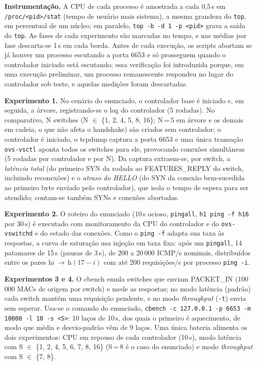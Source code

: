 \documentclass[12pt]{article}
\begin{document}
\textbf{Instrumentação.} A CPU de cada processo é amostrada a cada 0,5\,s em
\texttt{/proc/<pid>/stat} (tempo de usuário mais sistema), a mesma grandeza do
\texttt{top}, em percentual de um núcleo; em paralelo, \texttt{top -b -d 1 -p <pid>}
grava a saída do \texttt{top}. As fases de cada experimento são marcadas no tempo, e nas
médias por fase descarta-se 1\,s em cada borda. Antes de cada execução, os scripts
abortam se já houver um processo escutando a porta 6653 e só prosseguem quando o
controlador iniciado está escutando; essa verificação foi introduzida porque, em uma
execução preliminar, um processo remanescente respondeu no lugar do controlador sob
teste, e aquelas medições foram descartadas.

\textbf{Experimento 1.} No cenário do enunciado, o controlador base é iniciado e, em
seguida, a árvore, registrando-se o log do controlador (5 rodadas). No comparativo, N
switches (N $\in$ \{1, 2, 4, 5, 8, 16\}; N\,=\,5 em árvore e os demais em cadeia, o que
não afeta o handshake) são criados sem controlador; o controlador é iniciado, o tcpdump
captura a porta 6653 e uma única transação \texttt{ovs-vsctl} aponta todos os switches
para ele, provocando conexões simultâneas (5 rodadas por controlador e por N). Da
captura extraem-se, por switch, a \emph{latência total} (do primeiro SYN da rodada ao
FEATURES\_REPLY do switch, incluindo reconexões) e o \emph{atraso do HELLO} (do SYN da
conexão bem-sucedida ao primeiro byte enviado pelo controlador), que isola o tempo de
espera para ser atendido; contam-se também SYNs e conexões abortadas.

\textbf{Experimento 2.} O roteiro do enunciado (10\,s ocioso, \texttt{pingall},
\texttt{h1 ping -f h16} por 30\,s) é executado com monitoramento da CPU do controlador e
do \texttt{ovs-vswitchd} e do estado das conexões. Como o \texttt{ping -f} adapta sua taxa
às respostas, a curva de saturação usa injeção em taxa fixa: após um \texttt{pingall},
14 patamares de 15\,s (pausas de 3\,s), de 200 a 20\,000 ICMP/s nominais, distribuídos
entre os pares h$i$\,$\rightarrow$\,h$(17-i)$ com até 200 requisições/s por processo
\texttt{ping -i}.

\textbf{Experimentos 3 e 4.} O cbench emula switches que enviam PACKET\_IN (100\,000 MACs
de origem por switch) e mede as respostas; no modo latência (padrão) cada switch mantém
uma requisição pendente, e no modo \textit{throughput} (\texttt{-t}) envia sem esperar.
Usa-se o comando do enunciado, \texttt{cbench -c 127.0.0.1 -p 6653 -m 10000 -l 10 -s <S>}:
10 laços de 10\,s, dos quais o primeiro é aquecimento, de modo que média e desvio-padrão
vêm de 9 laços. Uma única bateria alimenta os dois experimentos: CPU em repouso de cada
controlador (10\,s), modo latência com S $\in$ \{1, 2, 4, 5, 6, 7, 8, 16\} (S\,=\,8 é o
caso do enunciado) e modo \textit{throughput} com S $\in$ \{7, 8\}.
\end{document}
